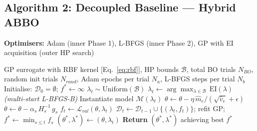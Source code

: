 \documentclass[11pt]{article}
\theoremstyle{definition}
\begin{document}
\subsection{Algorithm 2: Decoupled Baseline --- Hybrid ABBO}
\begin{algorithm}[H]
\caption{Hybrid ABBO --- Hybrid ABBO}
\label{alg:abbo}
\textbf{Optimisers:} Adam (inner Phase 1), L-BFGS (inner Phase 2),
GP with EI acquisition (outer HP search)
\begin{algorithmic}[1]
\Require GP surrogate with RBF kernel [Eq.~\eqref{eq:rbf}],
         HP bounds $\mathcal{B}$,
         total BO trials $N_{BO}$,
         random init trials $N_{rand}$,
         Adam epochs per trial $N_a$,
         L-BFGS steps per trial $N_b$
\State Initialise: $\mathcal{D}_0 = \emptyset$; $f^* \leftarrow \infty$
    \State $\lambda_t \sim \mathrm{Uniform}(\mathcal{B})$
  \Else
    \State $\lambda_t \leftarrow \arg\max_{\lambda \in \mathcal{B}}\,\mathrm{EI}(\lambda)$
           \hfill \textit{(multi-start L-BFGS-B)}
  \EndIf
  \State Instantiate model $\mathcal{M}(\lambda_t)$
    \State $\theta \leftarrow \theta - \eta\,\hat{m}_e / (\sqrt{\hat{v}_e}+\epsilon)$
  \EndFor
    \State $\theta \leftarrow \theta - \alpha_s\,H_s^{-1}\,g_s$
  \EndFor
  \State $f_t \leftarrow \mathcal{L}_{val}(\theta, \lambda_t)$
  \State $\mathcal{D}_t \leftarrow \mathcal{D}_{t-1} \cup \{(\lambda_t, f_t)\}$;
         refit GP; $f^* \leftarrow \min_{s \le t} f_s$
    \State $(\theta^*, \lambda^*) \leftarrow (\theta, \lambda_t)$
  \EndIf
\EndFor
\State \textbf{Return} $(\theta^*, \lambda^*)$ achieving best $f^*$
\end{algorithmic}
\end{algorithm}
\end{document}
